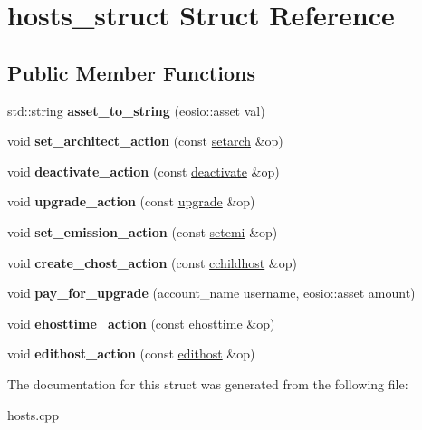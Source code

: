 \hypertarget{structhosts__struct}{}\section{hosts\+\_\+struct Struct Reference}
\label{structhosts__struct}
\subsection*{Public Member Functions}
\begin{DoxyCompactItemize}
\item 
\mbox{\label{structhosts__struct_a08d97b7a6405bc262244b635d9868ba1}} 
std\+::string {\bfseries asset\+\_\+to\+\_\+string} (eosio\+::asset val)
\item 
\mbox{\label{structhosts__struct_a5b2173f9e83dde801f2977f010a8eaba}} 
void {\bfseries set\+\_\+architect\+\_\+action} (const \mbox{\hyperlink{structeosio_1_1setarch}{setarch}} \&op)
\item 
\mbox{\label{structhosts__struct_a04debe9f1209fe1030630eccd391ffed}} 
void {\bfseries deactivate\+\_\+action} (const \mbox{\hyperlink{structeosio_1_1deactivate}{deactivate}} \&op)
\item 
\mbox{\label{structhosts__struct_af046e31dbddd749c91889346690b1799}} 
void {\bfseries upgrade\+\_\+action} (const \mbox{\hyperlink{structeosio_1_1upgrade}{upgrade}} \&op)
\item 
\mbox{\label{structhosts__struct_a56d22ccb4786f25fb2c438b2f7f031bf}} 
void {\bfseries set\+\_\+emission\+\_\+action} (const \mbox{\hyperlink{structeosio_1_1setemi}{setemi}} \&op)
\item 
\mbox{\label{structhosts__struct_a3533769131a1daf68adef7fe8d523f6a}} 
void {\bfseries create\+\_\+chost\+\_\+action} (const \mbox{\hyperlink{structeosio_1_1cchildhost}{cchildhost}} \&op)
\item 
\mbox{\label{structhosts__struct_ad776a2ad4e5b91678085f5c609c11aeb}} 
void {\bfseries pay\+\_\+for\+\_\+upgrade} (account\+\_\+name username, eosio\+::asset amount)
\item 
\mbox{\label{structhosts__struct_af00c7ff31d9091035c349da771c322c9}} 
void {\bfseries ehosttime\+\_\+action} (const \mbox{\hyperlink{structeosio_1_1ehosttime}{ehosttime}} \&op)
\item 
\mbox{\label{structhosts__struct_a899cd1ebd6f8ea3a78df2201ed7befac}} 
void {\bfseries edithost\+\_\+action} (const \mbox{\hyperlink{structeosio_1_1edithost}{edithost}} \&op)
\end{DoxyCompactItemize}


The documentation for this struct was generated from the following file\+:\begin{DoxyCompactItemize}
\item 
hosts.\+cpp\end{DoxyCompactItemize}
